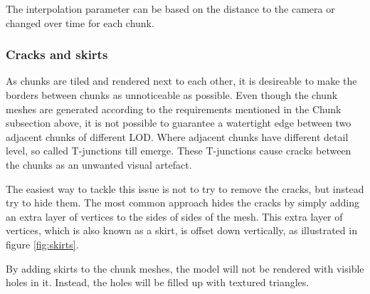 The interpolation parameter can be based on the distance to the camera or changed over time for each chunk.

\subsubsection{Cracks and skirts}
\label{section:cracksandskirts}
As chunks are tiled and rendered next to each other, it is desireable to make the borders between chunks as unnoticeable as possible. Even though the chunk meshes are generated according to the requirements mentioned in the Chunk subsection above, it is not possible to guarantee a watertight edge between two adjacent chunks of different LOD. Where adjacent chunks have different detail level, so called T-junctions till emerge. These T-junctions cause cracks between the chunks as an unwanted visual artefact.

The easiest way to tackle this issue is not to try to remove the cracks, but instead try to hide them. The most common approach hides the cracks by simply adding an extra layer of vertices to the sides of sides of the mesh. This extra layer of vertices, which is also known as a skirt, is offset down vertically, as illustrated in figure \ref{fig:skirts}. 

By adding skirts to the chunk meshes, the model will not be rendered with visible holes in it. Instead, the holes will be filled up with textured triangles.

